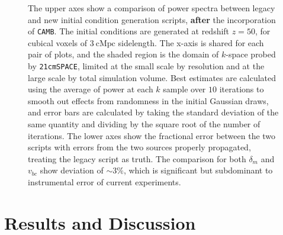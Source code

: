 \documentclass[floats,floatfix,showpacs,amssymb,prd,superscriptaddress,nofootinbib]{revtex4-2} %
\newcommand{\code}{\texttt}
\begin{document}
\begin{figure}[H]
        \caption{The upper axes show a comparison of power spectra between legacy and new initial condition generation scripts, \textbf{after} the incorporation of \code{CAMB}. The initial conditions are generated at redshift $z = 50$, for cubical voxels of $3 ~\text{cMpc}$ sidelength. The x-axis is shared for each pair of plots, and the shaded region is the domain of $k$-space probed by \code{21cmSPACE}, limited at the small scale by resolution and at the large scale by total simulation volume. Best estimates are calculated using the average of power at each $k$ sample over $10$ iterations to smooth out effects from randomness in the initial Gaussian draws, and error bars are calculated by taking the standard deviation of the same quantity and dividing by the square root of the number of iterations. The lower axes show the fractional error between the two scripts with errors from the two sources properly propagated, treating the legacy script as truth. The comparison for both $\delta_m$ and $v_{bc}$ show deviation of $\sim 3 \%$, which is significant but subdominant to instrumental error of current experiments.}
        \label{fig:compare_generators}
\end{figure}



\newpage
\section{Results and Discussion}
\end{document}
